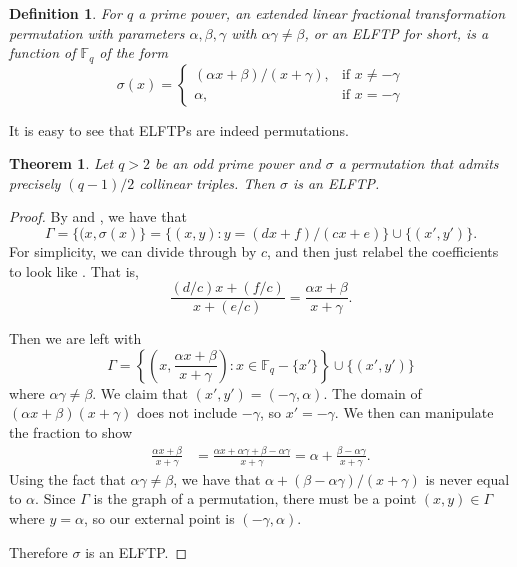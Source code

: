 \documentclass[12pt]{article}
\newcommand{\F}{\mathbb{F}}
\newtheorem{theorem}{Theorem}
\newtheorem{definition}{Definition}
\begin{document}
\begin{definition}
    For $q$ a prime power, an \em{extended linear fractional transformation permutation with parameters $\alpha,\beta,\gamma$} with $\alpha \gamma \neq \beta$, or an \em{ELFTP} for short, is a function of $\mathbb{F}_q$ of the form
\begin{equation} \label{eq1}
\sigma(x)=  \begin{cases}
                (\alpha x+\beta)/(x+\gamma), & \text{if $x \neq -\gamma$}\\
		      \alpha, & \text{if $x=-\gamma$}
            \end{cases}
\end{equation}
\end{definition}
It is easy to see that ELFTPs are indeed permutations.

\begin{theorem}\label{thm:fractional}
Let $q>2$ be an odd prime power and $\sigma$ a permutation that admits precisely $(q-1)/2$ collinear triples. Then $\sigma$ is an ELFTP.
\end{theorem}

\begin{proof}
By  and , we have that
\[
\Gamma = \{(x,\sigma(x)\} = \{(x,y) : y = (dx+f)/(cx+e)\}\cup \{(x',y')\}.
\]
For simplicity, we can divide through by $c$, and then just relabel the coefficients to look like . That is,
\[
\frac{(d/c)x + (f/c)}{x + (e/c)} = \frac{\alpha x+\beta}{x+\gamma}.
\]

Then we are left with
\[
\Gamma = \left\{ \left(x,\frac{\alpha x+\beta}{x+\gamma}\right): x \in \F_q-\{x'\} \right\} \cup \{(x',y')\}
\]
where $\alpha \gamma \neq \beta$. We claim that $(x',y') = (-\gamma,\alpha)$. The domain of $(\alpha x+\beta)(x+\gamma)$ does not include $-\gamma$, so $x'=-\gamma$. We then can manipulate the fraction to show
\begin{align*}
    \frac{\alpha x+\beta}{x+\gamma} &= \frac{\alpha x + \alpha \gamma + \beta - \alpha \gamma}{x+\gamma} = \alpha + \frac{\beta - \alpha \gamma}{x+\gamma}.
\end{align*}
Using the fact that $\alpha\gamma \neq \beta$, we have that $\alpha + (\beta-\alpha\gamma)/(x+\gamma)$ is never equal to $\alpha$. Since $\Gamma$ is the graph of a permutation, there must be a point $(x,y)\in\Gamma$ where $y=\alpha$, so our external point is $(-\gamma,\alpha)$. 

Therefore $\sigma$ is an ELFTP.
\end{proof}
\end{document}
